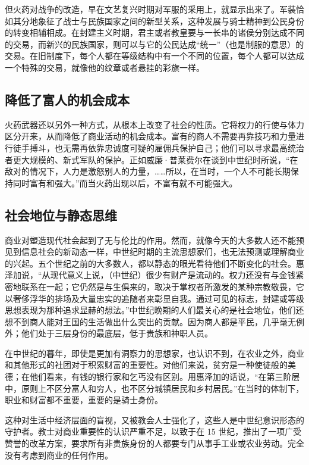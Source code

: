 但火药对战争的改造，早在文艺复兴时期对军服的采用上，就显示出来了。军装恰如其分地象征了战士与民族国家之间的新型关系，这种发展与骑士精神到公民身份的转变相辅相成。在封建主义时期，君主或者教皇要与一长串的诸侯分别达成不同的交易，而新兴的民族国家，则可以与它的公民达成“统一”（也是制服的意思）的交易。在旧制度下，每个人都在等级结构中有一个不同的位置，每个人都可以达成一个特殊的交易，就像他的纹章或者悬挂的彩旗一样。

\subsection{降低了富人的机会成本}
火药武器还以另外一种方式，从根本上改变了社会的性质。它将权力的行使与体力区分开来，从而降低了商业活动的机会成本。富有的商人不需要再靠技巧和力量进行徒手搏斗，也无需再依靠忠诚度可疑的雇佣兵保护自己；他们可以寻求最高统治者更大规模的、新式军队的保护。正如威廉·普莱费尔在谈到中世纪时所说，“在敌对的情况下，人力是激怒别人的力量，……所以，在当时，一个人不可能长期保持同时富有和强大。”而当火药出现以后，不富有就不可能强大。

\subsection{社会地位与静态思维}
商业对塑造现代社会起到了无与伦比的作用。然而，就像今天的大多数人还不能预见到信息社会的新动态一样，中世纪时期的主流思想家们，也无法预测或理解商业的兴起。五个世纪之前的大多数人，都以静态的眼光看待他们不断变化的社会。惠泽加说，“从现代意义上说，（中世纪）很少有财产是流动的。权力还没有与金钱紧密地联系在一起；它仍然是与生俱来的，取决于掌权者所激发的某种宗教敬畏，它以奢侈浮华的排场及大量忠实的追随者来彰显自我。通过可见的标志，封建或等级思想表现为那种追求显赫的想法。”中世纪晚期的人们最关心的是社会地位，他们还想不到商人能对王国的生活做出什么突出的贡献。因为商人都是平民，几乎毫无例外；他们处于三层身份的最底层，低于贵族和神职人员。

在中世纪的暮年，即使是更加有洞察力的思想家，也认识不到，在农业之外，商业和其他形式的社团对于积累财富的重要性。对他们来说，贫穷是一种使徒般的美德；在他们看来，有钱的银行家和乞丐没有区别。用惠泽加的话说，“在第三阶层中，原则上不区分富人和穷人，也不区分城镇居民和乡村居民。”在当时的体制下，职业和财富都不重要，重要的是骑士身份。

这种对生活中经济层面的盲视，又被教会人士强化了，这些人是中世纪意识形态的守护者。教士对商业重要性的认识严重不足，以致于在 15 世纪，推出了一项广受赞誉的改革方案，要求所有非贵族身份的人都要专门从事手工业或农业劳动。完全没有考虑到商业的任何作用。


